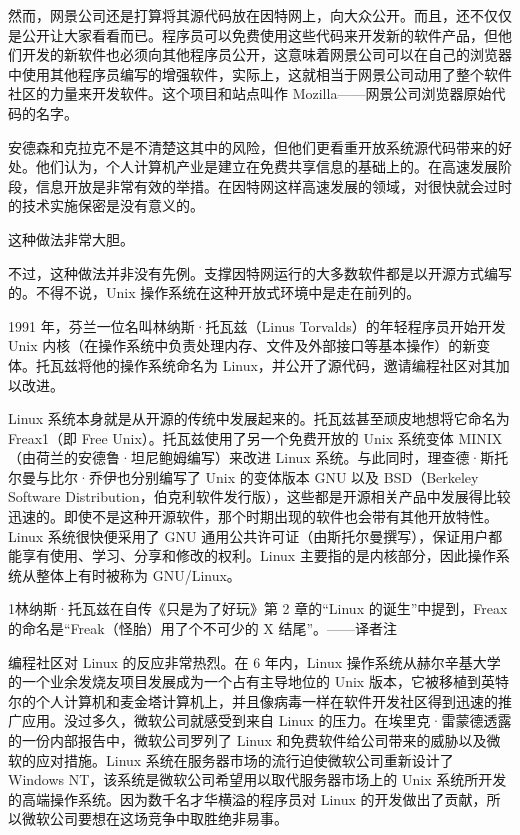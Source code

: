 \documentclass[12pt,UTF8]{ctexbook}
\begin{document}
然而，网景公司还是打算将其源代码放在因特网上，向大众公开。而且，还不仅仅是公开让大家看看而已。程序员可以免费使用这些代码来开发新的软件产品，但他们开发的新软件也必须向其他程序员公开，这意味着网景公司可以在自己的浏览器中使用其他程序员编写的增强软件，实际上，这就相当于网景公司动用了整个软件社区的力量来开发软件。这个项目和站点叫作 Mozilla——网景公司浏览器原始代码的名字。

安德森和克拉克不是不清楚这其中的风险，但他们更看重开放系统源代码带来的好处。他们认为，个人计算机产业是建立在免费共享信息的基础上的。在高速发展阶段，信息开放是非常有效的举措。在因特网这样高速发展的领域，对很快就会过时的技术实施保密是没有意义的。

这种做法非常大胆。

不过，这种做法并非没有先例。支撑因特网运行的大多数软件都是以开源方式编写的。不得不说，Unix 操作系统在这种开放式环境中是走在前列的。

1991 年，芬兰一位名叫林纳斯·托瓦兹（Linus Torvalds）的年轻程序员开始开发 Unix 内核（在操作系统中负责处理内存、文件及外部接口等基本操作）的新变体。托瓦兹将他的操作系统命名为 Linux，并公开了源代码，邀请编程社区对其加以改进。

Linux 系统本身就是从开源的传统中发展起来的。托瓦兹甚至顽皮地想将它命名为 Freax1（即 Free Unix）。托瓦兹使用了另一个免费开放的 Unix 系统变体 MINIX（由荷兰的安德鲁·坦尼鲍姆编写）来改进 Linux 系统。与此同时，理查德·斯托尔曼与比尔·乔伊也分别编写了 Unix 的变体版本 GNU 以及 BSD（Berkeley Software Distribution，伯克利软件发行版），这些都是开源相关产品中发展得比较迅速的。即使不是这种开源软件，那个时期出现的软件也会带有其他开放特性。Linux 系统很快便采用了 GNU 通用公共许可证（由斯托尔曼撰写），保证用户都能享有使用、学习、分享和修改的权利。Linux 主要指的是内核部分，因此操作系统从整体上有时被称为 GNU/Linux。

1林纳斯·托瓦兹在自传《只是为了好玩》第 2 章的“Linux 的诞生”中提到，Freax 的命名是“Freak（怪胎）用了个不可少的 X 结尾”。——译者注

编程社区对 Linux 的反应非常热烈。在 6 年内，Linux 操作系统从赫尔辛基大学的一个业余发烧友项目发展成为一个占有主导地位的 Unix 版本，它被移植到英特尔的个人计算机和麦金塔计算机上，并且像病毒一样在软件开发社区得到迅速的推广应用。没过多久，微软公司就感受到来自 Linux 的压力。在埃里克·雷蒙德透露的一份内部报告中，微软公司罗列了 Linux 和免费软件给公司带来的威胁以及微软的应对措施。Linux 系统在服务器市场的流行迫使微软公司重新设计了 Windows NT，该系统是微软公司希望用以取代服务器市场上的 Unix 系统所开发的高端操作系统。因为数千名才华横溢的程序员对 Linux 的开发做出了贡献，所以微软公司要想在这场竞争中取胜绝非易事。
\end{document}
